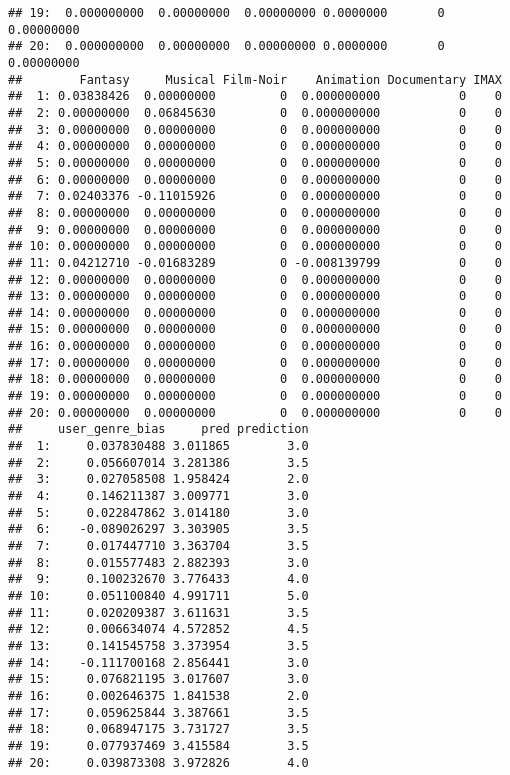 \documentclass[
]{article}
\begin{document}
\begin{verbatim}
## 19:  0.000000000  0.00000000  0.00000000 0.0000000       0 0.00000000
## 20:  0.000000000  0.00000000  0.00000000 0.0000000       0 0.00000000
##        Fantasy     Musical Film-Noir    Animation Documentary IMAX
##  1: 0.03838426  0.00000000         0  0.000000000           0    0
##  2: 0.00000000  0.06845630         0  0.000000000           0    0
##  3: 0.00000000  0.00000000         0  0.000000000           0    0
##  4: 0.00000000  0.00000000         0  0.000000000           0    0
##  5: 0.00000000  0.00000000         0  0.000000000           0    0
##  6: 0.00000000  0.00000000         0  0.000000000           0    0
##  7: 0.02403376 -0.11015926         0  0.000000000           0    0
##  8: 0.00000000  0.00000000         0  0.000000000           0    0
##  9: 0.00000000  0.00000000         0  0.000000000           0    0
## 10: 0.00000000  0.00000000         0  0.000000000           0    0
## 11: 0.04212710 -0.01683289         0 -0.008139799           0    0
## 12: 0.00000000  0.00000000         0  0.000000000           0    0
## 13: 0.00000000  0.00000000         0  0.000000000           0    0
## 14: 0.00000000  0.00000000         0  0.000000000           0    0
## 15: 0.00000000  0.00000000         0  0.000000000           0    0
## 16: 0.00000000  0.00000000         0  0.000000000           0    0
## 17: 0.00000000  0.00000000         0  0.000000000           0    0
## 18: 0.00000000  0.00000000         0  0.000000000           0    0
## 19: 0.00000000  0.00000000         0  0.000000000           0    0
## 20: 0.00000000  0.00000000         0  0.000000000           0    0
##     user_genre_bias     pred prediction
##  1:     0.037830488 3.011865        3.0
##  2:     0.056607014 3.281386        3.5
##  3:     0.027058508 1.958424        2.0
##  4:     0.146211387 3.009771        3.0
##  5:     0.022847862 3.014180        3.0
##  6:    -0.089026297 3.303905        3.5
##  7:     0.017447710 3.363704        3.5
##  8:     0.015577483 2.882393        3.0
##  9:     0.100232670 3.776433        4.0
## 10:     0.051100840 4.991711        5.0
## 11:     0.020209387 3.611631        3.5
## 12:     0.006634074 4.572852        4.5
## 13:     0.141545758 3.373954        3.5
## 14:    -0.111700168 2.856441        3.0
## 15:     0.076821195 3.017607        3.0
## 16:     0.002646375 1.841538        2.0
## 17:     0.059625844 3.387661        3.5
## 18:     0.068947175 3.731727        3.5
## 19:     0.077937469 3.415584        3.5
## 20:     0.039873308 3.972826        4.0
\end{verbatim}
\end{document}
